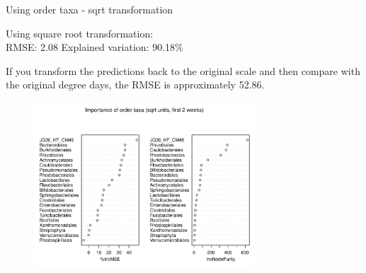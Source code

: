 \documentclass{beamer}
\begin{document}
\begin{frame}{Using order taxa - sqrt transformation}

  {\scriptsize
    
  \noindent Using square root transformation:\\
  RMSE: 2.08  \hspace{0.05in}  Explained variation: 90.18\%

  \vspace{0.05in}
  
  \noindent If you transform the predictions back to the original
  scale and then compare with the original degree days, the RMSE is
  approximately 52.86.
  
\begin{center}
\begin{figure}
  \includegraphics[width=3.25in]{../only_orders/first_two_weeks/sqrt_units_first_two_weeks_orders_imp_plot}
\end{figure}
\end{center}
\vspace{-0.25in}
}
  
\end{frame}
\end{document}

